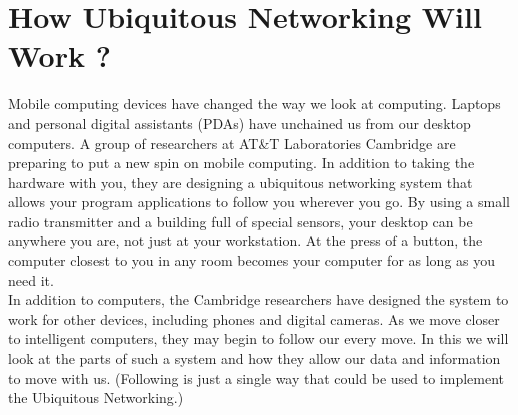 \documentclass[12pt]{report}
\begin{document}
\chapter{How Ubiquitous Networking Will Work ? }
\hspace*{0.5in}Mobile computing devices have changed the way we look at computing. Laptops and personal digital assistants (PDAs) have unchained us from our desktop computers. A group of researchers at AT&T Laboratories Cambridge are preparing to put a new spin on mobile computing. In addition to taking the hardware with you, they are designing a ubiquitous networking system that allows your program applications to follow you wherever you go. By using a small radio transmitter and a building full of special sensors, your desktop can be anywhere you are, not just at your workstation. At the press of a button, the computer closest to you in any room becomes your computer for as long as you need it.
\\\hspace*{0.5in}In addition to computers, the Cambridge researchers have designed the system to work for other devices, including phones and digital cameras. As we move closer to intelligent computers, they may begin to follow our every move. In this we will look at the parts of such a system and how they allow our data and information to move with us. (Following is just a single way that could be used to implement the Ubiquitous Networking.)
\end{document}

